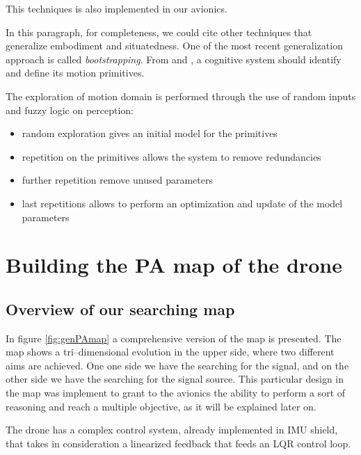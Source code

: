This techniques is also implemented in our avionics.

In this paragraph, for completeness, we could cite other techniques that generalize embodiment and situatedness. One of the most recent generalization approach is called \emph{bootstrapping}. From \citep{sun2001implicit} and \citep{hierarchicalbootstrapping}, a cognitive system should identify and define its motion primitives. 

The exploration of motion domain is performed through the use of random inputs and fuzzy logic\citep{aframeworkforhierarchicalperceptionaction} on perception:
\begin{itemize}
\item random exploration gives an initial model for the primitives
\item repetition on the primitives allows the system to remove redundancies
\item further repetition remove unused parameters
\item last repetitions allows to perform an optimization and update of the model parameters
\end{itemize}

\section{Building the PA map of the drone}

\subsection{Overview of our searching map}

In figure \ref{fig:genPAmap} a comprehensive version of the map is presented. The map shows a tri--dimensional evolution in the upper side, where two different aims are achieved. One one side we have the searching for the signal, and on the other side we have the searching for the signal source. This particular design in the map was implement to grant to the avionics the ability to perform a sort of reasoning and reach a multiple objective, as it will be explained later on.

The drone has a complex control system, already implemented in IMU shield, that takes in consideration a linearized feedback that feeds an LQR control loop. 

